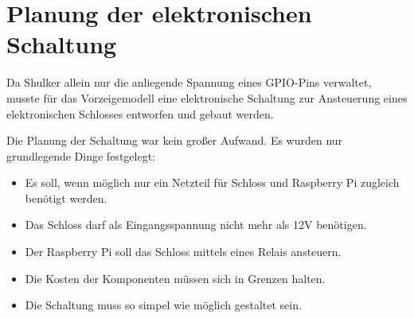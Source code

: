 \section{Planung der elektronischen Schaltung}
Da Shulker allein nur die anliegende Spannung eines GPIO-Pins verwaltet, musste für das Vorzeigemodell eine
elektronische Schaltung zur Ansteuerung eines elektronischen Schlosses entworfen und gebaut werden.

Die Planung der Schaltung war kein großer Aufwand. Es wurden nur grundlegende Dinge festgelegt:
\begin{itemize}
    \item Es soll, wenn möglich nur ein Netzteil für Schloss und Raspberry Pi zugleich benötigt werden.
    \item Das Schloss darf als Eingangsspannung nicht mehr als 12V benötigen.
    \item Der Raspberry Pi soll das Schloss mittels eines Relais ansteuern.
    \item Die Kosten der Komponenten müssen sich in Grenzen halten.
    \item Die Schaltung muss so simpel wie möglich gestaltet sein.
\end{itemize}